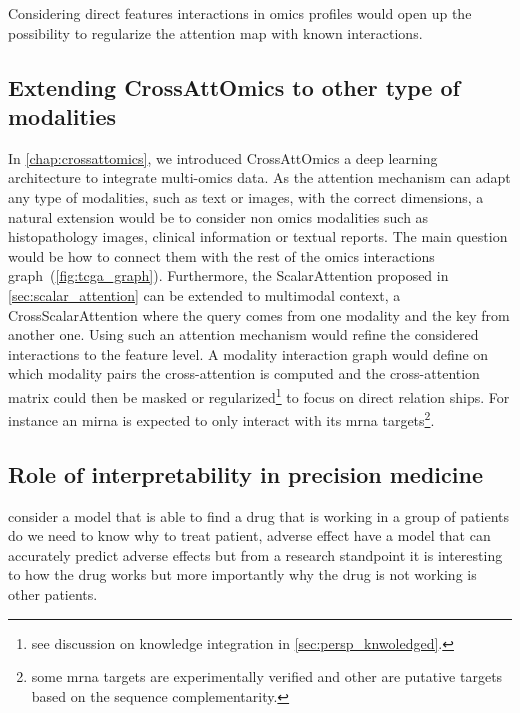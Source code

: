 \documentclass[../main.tex]{subfiles}
\begin{document}
		Considering direct features interactions in omics profiles would open up the possibility to regularize the attention map with known interactions.

	\subsection{Extending CrossAttOmics to other type of modalities}
		In \cref{chap:crossattomics}, we introduced CrossAttOmics a deep learning architecture to integrate multi-omics data.
		As the attention mechanism can adapt any type of modalities, such as text or images, with the correct dimensions, a natural extension would be to consider non omics modalities such as histopathology images, clinical information or textual reports.
		The main question would be how to connect them with the rest of the omics interactions graph~(\cref{fig:tcga_graph}).
		Furthermore, the ScalarAttention proposed in \cref{sec:scalar_attention} can be extended to multimodal context, \ie{}a CrossScalarAttention where the query comes from one modality and the key from another one.
		Using such an attention mechanism would refine the considered interactions to the feature level.
		A modality interaction graph would define on which modality pairs the cross-attention is computed and the cross-attention matrix could then be masked or regularized\footnote{see discussion on knowledge integration in \cref{sec:persp_knwoledged}.} to focus on direct relation ships.
		For instance an \gls{mirna} is expected to only interact with its \gls{mrna} targets\footnote{some \gls{mrna} targets are experimentally verified and other are putative targets based on the sequence complementarity.}.

	\subsection{Role of interpretability in precision medicine}
		consider a model that is able to find a drug that is working in a group of patients
		do we need to know why to treat patient, adverse effect have a model that can accurately predict adverse effects
		but from a research standpoint it is interesting to how the drug works but more importantly why the drug is not working is other patients.
\end{document}
